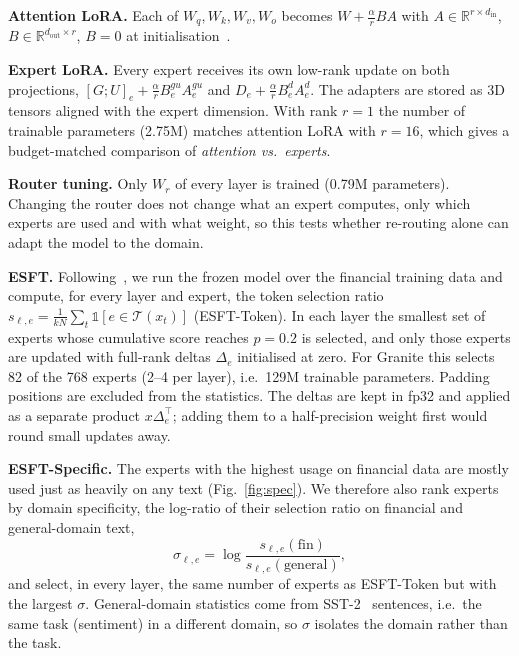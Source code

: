 \textbf{Attention LoRA.} Each of $W_q,W_k,W_v,W_o$ becomes $W + \frac{\alpha}{r}BA$ with
$A\in\mathbb{R}^{r\times d_\text{in}}$, $B\in\mathbb{R}^{d_\text{out}\times r}$, $B=0$ at initialisation~\cite{hu2022lora}.

\textbf{Expert LoRA.} Every expert receives its own low-rank update on both projections,
$[G;U]_e + \frac{\alpha}{r}B^{gu}_e A^{gu}_e$ and $D_e + \frac{\alpha}{r}B^{d}_e A^{d}_e$.
The adapters are stored as 3D tensors aligned with the expert dimension. With rank $r=1$ the
number of trainable parameters (2.75M) matches attention LoRA with $r=16$, which gives a
budget-matched comparison of \emph{attention vs.\ experts}.

\textbf{Router tuning.} Only $W_r$ of every layer is trained (0.79M parameters). Changing the
router does not change what an expert computes, only which experts are used and with what
weight, so this tests whether re-routing alone can adapt the model to the domain.

\textbf{ESFT.} Following~\cite{wang2024esft}, we run the frozen model over the financial
training data and compute, for every layer and expert, the token selection ratio
$s_{\ell,e} = \frac{1}{kN}\sum_{t} \mathbb{1}[e\in\mathcal{T}(x_t)]$ (ESFT-Token).
In each layer the smallest set of experts whose cumulative score reaches $p=0.2$ is selected,
and only those experts are updated with full-rank deltas $\Delta_e$ initialised at zero. For
Granite this selects 82 of the 768 experts (2--4 per layer), i.e.\ 129M trainable parameters.
Padding positions are excluded from the statistics. The deltas are kept in fp32 and applied as
a separate product $x\Delta_e^\top$; adding them to a half-precision weight first would round
small updates away.

\textbf{ESFT-Specific.} The experts with the highest usage on financial data are mostly used
just as heavily on any text (Fig.~\ref{fig:spec}). We therefore also rank experts by domain
specificity, the log-ratio of their selection ratio on financial and general-domain text,
\begin{equation}
  \sigma_{\ell,e} = \log \frac{s_{\ell,e}(\text{fin})}{s_{\ell,e}(\text{general})},
\end{equation}
and select, in every layer, the same number of experts as ESFT-Token but with the largest
$\sigma$. General-domain statistics come from SST-2~\cite{socher2013sst} sentences, i.e.\ the
same task (sentiment) in a different domain, so $\sigma$ isolates the domain rather than the task.

